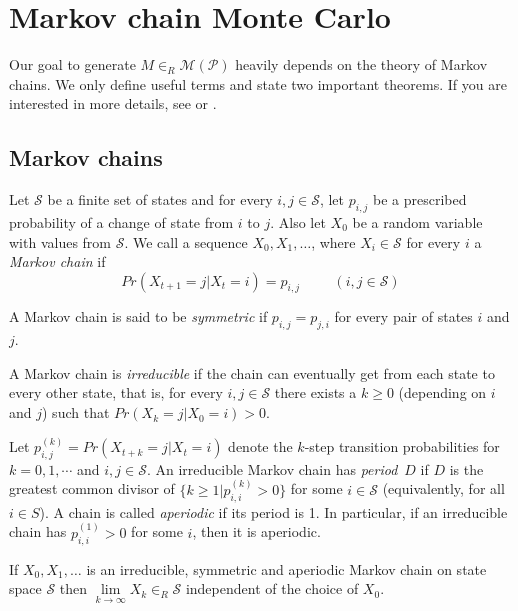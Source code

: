 \chapter{Markov chain Monte Carlo}
\label{chap:mcmc}
Our goal to generate $M\in_R\mathcal{M}(\mathcal{P})$ heavily depends on the theory of Markov chains. We only define useful terms and state two important theorems. If you are interested in more details, see \cite{Madras} or \cite{Karlin}.

\section{Markov chains}
\begin{defn}
Let $\mathcal{S}$ be a finite set of states and for every $i,j\in\mathcal{S}$, let $p_{i,j}$ be a prescribed probability of a change of state from $i$ to $j$. Also let $X_0$ be a random variable with values from $\mathcal{S}$. We call a sequence $X_0,X_1,\dots$, where $X_i\in\mathcal{S}$ for every $i$ a \emph{Markov chain} if
$$Pr(X_{t+1}=j|X_t=i)=p_{i,j} \hspace{1cm} (i,j\in\mathcal{S})$$
\end{defn}
\begin{defn}
A Markov chain is said to be \emph{symmetric} if $p_{i,j}=p_{j,i}$ for every pair of states $i$ and $j$.
\end{defn}
\begin{defn}
A Markov chain is \emph{irreducible} if the chain can eventually get from each state to every other state, that is, for every $i,j\in\mathcal{S}$ there exists a $k\geq0$ (depending on $i$ and $j$) such that $Pr(X_k=j|X_0=i)>0$.
\end{defn}
\begin{defn}
Let $p_{i,j}^{(k)}=Pr(X_{t+k}=j|X_t=i)$ denote the $k$-step transition probabilities for $k=0,1,\cdots$ and $i,j\in\mathcal{S}$. An irreducible Markov chain has \emph{period}~$D$ if $D$ is the greatest common divisor of $\{k\geq1|p_{i,i}^{(k)}>0\}$ for some $i\in\mathcal{S}$ (equivalently, for all $i\in S$). A chain is called \emph{aperiodic} if its period is 1. In particular, if an irreducible chain has $p_{i,i}^{(1)}>0$ for some $i$, then it is aperiodic.
\end{defn}

If $X_0,X_1,\dots$ is an irreducible, symmetric and aperiodic Markov chain on state space $\mathcal{S}$ then $\lim\limits_{k\rightarrow\infty}X_k\in_R\mathcal{S}$ independent of the choice of $X_0$.

